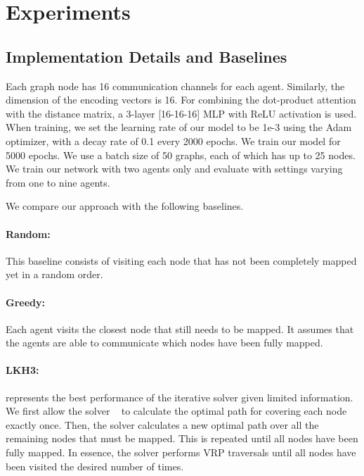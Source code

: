\section{Experiments}
\subsection{Implementation Details and Baselines}
Each graph node has 16 communication channels for each agent. Similarly, the dimension of the
encoding vectors is 16. For combining the dot-product attention with the distance matrix, a 3-layer
[16-16-16] MLP with ReLU activation is used. When training, we set the learning rate of our model to
be 1e-3 using the Adam optimizer, with a decay rate of 0.1 every 2000 epochs. We train our model for
5000 epochs. We use a batch size of 50 graphs, each of which has up to 25 nodes. We train our
network with two agents only and evaluate with settings varying from one to nine agents.




We compare our approach with the following baselines.
\paragraph{Random:} This baseline consists of visiting each node that has not been completely mapped
yet in a random order.

\vspace{-0.1in}
\paragraph{Greedy:} Each agent visits the closest node that still needs to be mapped. It assumes
that the agents are able to communicate which nodes have been fully mapped.

\vspace{-0.1in}
\paragraph{LKH3:} represents the best  performance of the iterative solver given limited information.
We first allow the solver ~\citep{lkh3} to calculate the optimal path for covering each
 node exactly once. Then, the solver calculates a new optimal path over all the remaining
nodes that must be mapped. This is repeated until all nodes have been fully mapped. In essence, the
solver performs VRP traversals until all nodes have been visited the desired number of times.

